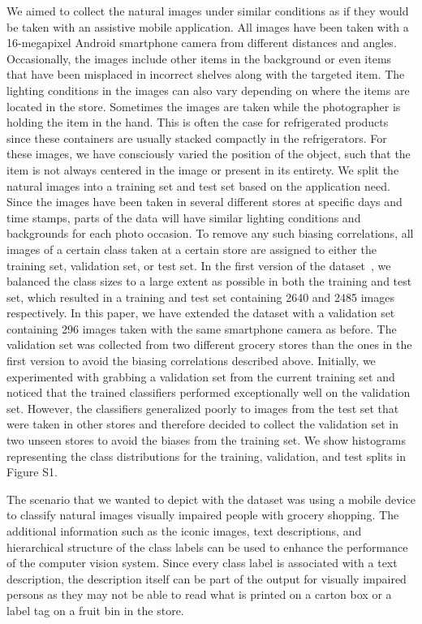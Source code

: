 We aimed to collect the natural images under similar conditions as if they would be taken with an assistive mobile application. 
All images have been taken with a 16-megapixel Android smartphone camera from different distances and angles. 
Occasionally, the images include other items in the background or even items that have been misplaced in incorrect shelves along with the targeted item.
The lighting conditions in the images can also vary depending on where the items are located in the store. Sometimes the images are taken while the photographer is holding the item in the hand. This is often the case for refrigerated products since these containers are usually stacked compactly in the refrigerators. For these images, we have consciously varied the position of the object, such that the item is not always centered in the image or present in its entirety. We split the natural images into a training set and test set based on the application need. Since the images have been taken in several different stores at specific days and time stamps, parts of the data will have similar lighting conditions and backgrounds for each photo occasion. To remove any such biasing correlations, all images of a certain class taken at a certain store are assigned to either the training set, validation set, or test set. In the first version of the dataset~\cite{klasson2019hierarchical}, we balanced the class sizes to a large extent as possible in both the training and test set, which resulted in a training and test set containing 2640 and 2485 images respectively. In this paper, we have extended the dataset with a validation set containing 296 images taken with the same smartphone camera as before. The validation set was collected from two different grocery stores than the ones in the first version to avoid the biasing correlations described above. 
Initially, we experimented with grabbing a validation set from the current training set and noticed that the trained classifiers performed exceptionally well on the validation set. However, the classifiers generalized poorly to images from the test set that were taken in other stores and therefore decided to collect the validation set in two unseen stores to avoid the biases from the training set. We show histograms representing the class distributions for the training, validation, and test splits in Figure S1.

The scenario that we wanted to depict with the dataset was using a mobile device to classify natural images visually impaired people with grocery shopping. The additional information such as the iconic images, text descriptions, and hierarchical structure of the class labels can be used to enhance the performance of the computer vision system. Since every class label is associated with a text description, the description itself can be part of the output for visually impaired persons as they may not be able to read what is printed on a carton box or a label tag on a fruit bin in the store. 

